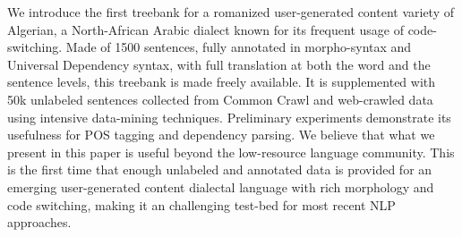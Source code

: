 We introduce the first treebank for a romanized user-generated content variety of Algerian, a North-African Arabic dialect known for its frequent usage of code-switching. Made of 1500 sentences, fully annotated in morpho-syntax and Universal Dependency syntax, with full translation at both the word and the sentence levels, this treebank is made freely available. It is supplemented with 50k unlabeled sentences collected from Common Crawl and web-crawled data using intensive data-mining techniques. Preliminary experiments demonstrate its usefulness for POS tagging and dependency parsing. We believe that what we present in this paper is useful beyond the low-resource language community. This is the first time that enough unlabeled and annotated data is provided for an emerging user-generated content dialectal language with rich morphology and code switching, making it an challenging test-bed for most recent NLP approaches.

